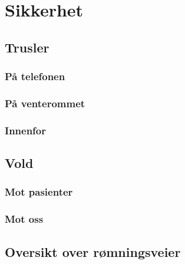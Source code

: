 \chapter{Sikkerhet}
			\section{Trusler}
				\subsection{På telefonen}
				\subsection{På venterommet}
				\subsection{Innenfor}
			\section{Vold}
				\subsection{Mot pasienter}
				\subsection{Mot oss}
			\section{Oversikt over rømningsveier}
